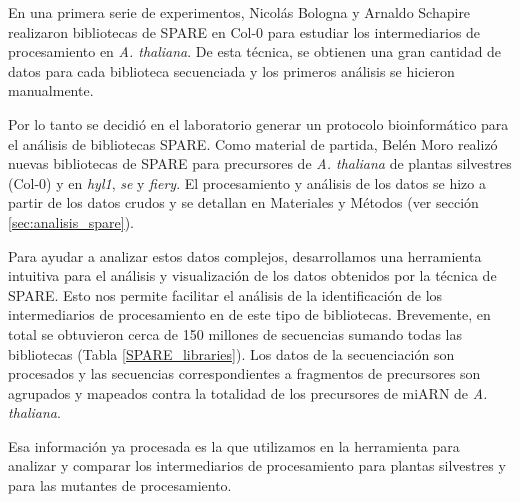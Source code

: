 En una primera serie de experimentos, Nicolás Bologna y Arnaldo Schapire realizaron bibliotecas de SPARE en Col-0 para estudiar los intermediarios de procesamiento en \textit{A. thaliana}.
De esta técnica, se obtienen una gran cantidad de datos para cada biblioteca secuenciada y los primeros análisis se hicieron manualmente.

Por lo tanto se decidió en el laboratorio generar un protocolo bioinformático para el análisis de bibliotecas SPARE. 
Como material de partida, Belén Moro realizó nuevas bibliotecas de SPARE para precursores de \textit{A. thaliana} de plantas silvestres (Col-0) y en \textit{hyl1}, \textit{se} y \textit{fiery}.
El procesamiento y análisis de los datos se hizo a partir de los datos crudos y se detallan en Materiales y Métodos (ver sección \ref{sec:analisis_spare}).

Para ayudar a analizar estos datos complejos, desarrollamos una herramienta intuitiva para el análisis y visualización de los datos obtenidos por la técnica de SPARE.
Esto nos permite facilitar el análisis de la identificación de los intermediarios de procesamiento en de este tipo de bibliotecas.
Brevemente, en total se obtuvieron cerca de 150 millones de secuencias sumando todas las bibliotecas (Tabla \ref{SPARE_libraries}).
Los datos de la secuenciación son procesados y las secuencias correspondientes a fragmentos de precursores son agrupados y mapeados contra la totalidad de los precursores de miARN de \textit{A. thaliana}.

Esa información ya procesada es la que utilizamos en la herramienta para analizar y comparar los intermediarios de procesamiento para plantas silvestres y para las mutantes de procesamiento.


